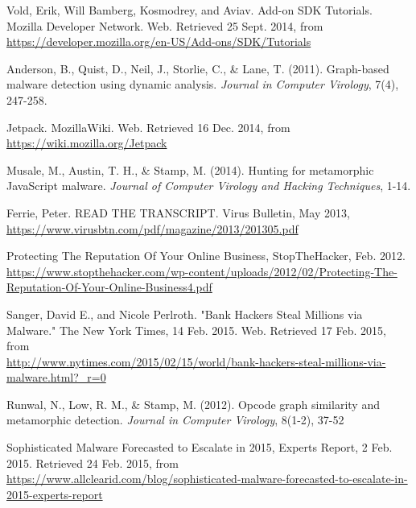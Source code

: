 %
%
%
%
\begin{thebibliography}{10}

 Vold, Erik, Will Bamberg, Kosmodrey, and Aviav. Add-on SDK Tutorials. Mozilla Developer Network. Web. Retrieved 25 Sept. 2014, from \\
\url{https://developer.mozilla.org/en-US/Add-ons/SDK/Tutorials}

 Anderson, B., Quist, D., Neil, J., Storlie, C., \& Lane, T. (2011). Graph-based malware detection using dynamic analysis. {\it Journal in Computer Virology}, 7(4), 247-258.

 Jetpack. MozillaWiki. Web. Retrieved 16 Dec. 2014, from \\ 
\url{https://wiki.mozilla.org/Jetpack}

 Musale, M., Austin, T. H., \& Stamp, M. (2014). Hunting for metamorphic JavaScript malware. {\it Journal of Computer Virology and Hacking Techniques}, 1-14.

 Ferrie, Peter. READ THE TRANSCRIPT. Virus Bulletin, May 2013, \\
\url{https://www.virusbtn.com/pdf/magazine/2013/201305.pdf}

 Protecting The Reputation Of Your Online Business, StopTheHacker, Feb. 2012. \\
\url{https://www.stopthehacker.com/wp-content/uploads/2012/02/Protecting-The-Reputation-Of-Your-Online-Business4.pdf}

 Sanger, David E., and Nicole Perlroth. "Bank Hackers Steal Millions via Malware." The New York Times, 14 Feb. 2015. Web. Retrieved 17 Feb. 2015, from \\
\url{http://www.nytimes.com/2015/02/15/world/bank-hackers-steal-millions-via-malware.html?_r=0}

 Runwal, N., Low, R. M., \& Stamp, M. (2012). Opcode graph similarity and metamorphic detection. {\it Journal in Computer Virology}, 8(1-2), 37-52

 Sophisticated Malware Forecasted to Escalate in 2015, Experts Report, 2 Feb. 2015. Retrieved 24 Feb. 2015, from \\
\url{https://www.allclearid.com/blog/sophisticated-malware-forecasted-to-escalate-in-2015-experts-report}


\end{thebibliography}
